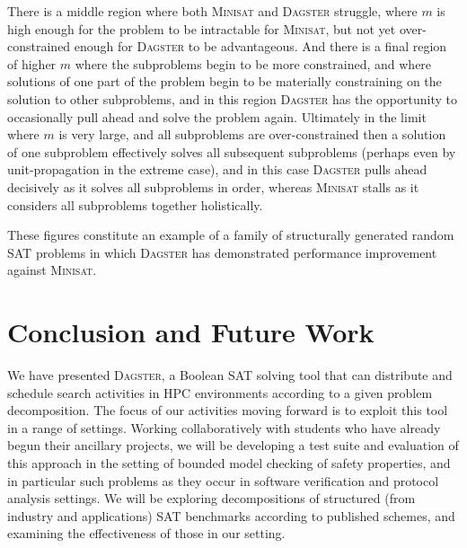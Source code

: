 \documentclass[
10pt, %
a4paper, %
oneside, %
headinclude,footinclude, %
BCOR5mm, %
]{scrartcl}
\begin{document}
There is a middle region where both \textsc{Minisat} and \textsc{Dagster} struggle, where $m$ is high enough for the problem to be intractable for \textsc{Minisat}, but not yet over-constrained enough
for \textsc{Dagster} to be advantageous.
And there is a final region of higher $m$ where the subproblems begin to be more constrained, and where solutions of one part of the problem begin to be materially constraining on the solution
to other subproblems, and in this region \textsc{Dagster} has the opportunity to occasionally pull ahead and solve the problem again.
Ultimately in the limit where $m$ is very large, and all subproblems are over-constrained then a solution of one subproblem effectively solves all subsequent subproblems 
(perhaps even by unit-propagation in the extreme case), and in this case \textsc{Dagster} pulls ahead decisively as it solves all subproblems in order, whereas \textsc{Minisat} stalls as it considers all 
subproblems together holistically.

These figures constitute an example of a family of structurally generated random SAT problems in which \textsc{Dagster} has demonstrated performance improvement against \textsc{Minisat}.









\section{Conclusion and Future Work}


We have presented \textsc{Dagster}, a Boolean SAT solving tool that can distribute and schedule search activities in HPC environments according to a given problem decomposition.
The focus of our activities moving forward is to exploit this tool in a range of settings.
Working collaboratively with students who have already begun their ancillary projects, we will be developing a test suite and evaluation of this approach in the setting of bounded model checking of safety properties, and in particular such problems as they occur in software verification and protocol analysis settings. 
We will be exploring decompositions of structured (from industry and applications) SAT benchmarks according to published schemes, and examining the effectiveness of those in our setting. 



\renewcommand{\refname}{\spacedlowsmallcaps{References}} %

\end{document}

